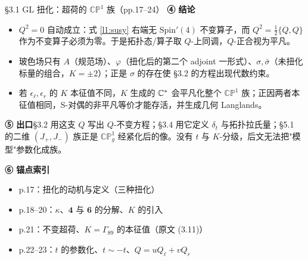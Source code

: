 \begin{kcard}{§3.1 GL 扭化：超荷的 $\mathbb{CP}^1$ 族（pp.17--24）}
\noindent\textbf{④ 结论}\quad
\begin{itemize}
\item $Q^2=0$ 自动成立：式 \eqref{l1:susy} 右端无 $\mathrm{Spin}'(4)$ 不变算子，而 $Q^2=\frac12\{Q,Q\}$ 作为不变算子必须为零。于是拓扑态/算子取 $Q$-上同调，$Q$-正合视为平凡。\pA{}
\item 玻色场只有 $A$（规范场）、$\varphi$（扭化后的第二个 adjoint 一形式）、$\sigma,\bar\sigma$（未扭化标量的组合，$K=\pm2$）；正是 $\sigma$ 的存在使 \S3.2 的方程出现代数约束。\pA{}
\item 若 $\epsilon_\ell,\epsilon_r$ 的 $K$ 本征值不同，$K$ 生成的 $\mathbb{C}^*$ 会平凡化整个 $\mathbb{CP}^1$ 族；正因两者本征值相同，S-对偶的非平凡等价才能存活，并生成几何 Langlands。\pA{}
\end{itemize}

\noindent\textbf{⑤ 出口}\quad \S3.2 用这支 $Q$ 写出 $Q$-不变方程；\S3.4 用它定义 $\delta_t$ 与拓扑拉氏量；\S5.1 的二维 $(J_+,J_-)$ 族正是 $\mathbb{CP}^1_g$ 经紧化后的像。没有 $t$ 与 $K$-分级，后文无法把"模型"参数化成族。\pB{}

\noindent\textbf{⑥ 锚点索引}\quad
\begin{itemize}
\item p.17：扭化的动机与定义（三种扭化）
\item p.18--20：$\kappa$、$\mathbf 4$ 与 $\mathbf 6$ 的分解、$K$ 的引入
\item p.21：不变超荷、$K=\Gamma_{89}$ 的本征值（原文 (3.11)）
\item p.22--23：$t$ 的参数化、$t\sim-t$、$Q=uQ_\ell+vQ_r$
\end{itemize}
\end{kcard}

\noindent{}

\noindent{}

